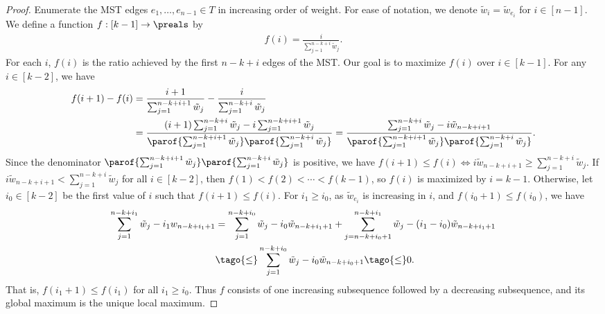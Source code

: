 \documentclass{toc}
\newcommand{\apxweight}{\tilde{w}}%
\newcommand{\apxweightof}[1]{\apxweight_{#1}}%
\begin{document}
%
%
%
%
\begin{proof}%
  \newcommand{\sumweight}[1]{\sum_{j=1}^{n - k + #1} \apxweightof{j}}%
  Enumerate the MST edges $e_1,\dots,e_{n-1} \in T$ in increasing
  order of weight.  For ease of notation, we denote
  $\apxweightof{i} = \apxweightof{e_i}$ for $i \in [n-1]$. We define a
  function $f: [k-1] \to \preals$ by
  \begin{align*}
    f(i) = \frac{i}{\sumweight{i}}.
  \end{align*}
  For each $i$, $f(i)$ is the ratio achieved by the first $n - k + i$
  edges of the MST. Our goal is to maximize $f(i)$ over $i \in
  [k-1]$. For any $i \in [k-2]$, we have
  \begin{align*}
    f(i+1) - f(i)               %
    &=
      \frac{i+1}{\sumweight{i + 1}} -
      \frac{i}{\sumweight{i}} %
    \\
    &=                           %
      \frac{                     %
      (i+1) \sumweight{i} - i \sumweight{i + 1}                        %
      }{                        %
      \parof{\sumweight{i+1}}\parof{\sumweight{i}}                    %
      } %
          =
          \frac{\sumweight{i}- i \apxweightof{n - k + i + 1}}{\parof{\sumweight{i+1}}\parof{\sumweight{i}}}.
  \end{align*}
  Since the denominator $\parof{\sumweight{i+1}}\parof{\sumweight{i}}$
  is positive, we have
  \begin{math}
    f(i+1) \leq f(i) \iff i \apxweightof{n - k + i + 1} \geq
    \sumweight{i}.
  \end{math}
  If $i \apxweightof{n - k + i + 1} < \sumweight{i}$ for all
  $i \in [k-2]$, then $f(1) < f(2) < \cdots < f(k-1)$, so $f(i)$ is
  maximized by $i = k - 1$. Otherwise, let $i_0 \in [k-2]$ be the
  first value of $i$ such that $f(i+1) \leq f(i)$. For $i_1 \geq i_0$,
  as \tagr $\apxweightof{e_i}$ is increasing in $i$, and \tagr
  $f(i_0 + 1) \leq f(i_0)$, we have
  \begin{align*}
    \sumweight{i_1} - i_1 w_{n - k + i_1 + 1} %
    &=                                                     %
      \sumweight{i_0} - i_0 \apxweightof{n-k+i_1 + 1} + \sum_{j=n-k+i_0 + 1}^{n
      - k + i_1} \apxweightof{j} - (i_1 - i_0) \apxweightof{n-k+i_1+1} %
    \\
    &\tago{\leq}                          %
      \sumweight{i_0} - i_0 \apxweightof{n - k + i_0 + 1} %
      \tago{\leq}                      %
      0.
  \end{align*}
  That is, $f(i_1 + 1) \leq f(i_1)$ for all $i_1 \geq i_0$. Thus $f$
  consists of one increasing subsequence followed by a decreasing
  subsequence, and its global maximum is the unique local maximum.
\end{proof}
\end{document}
